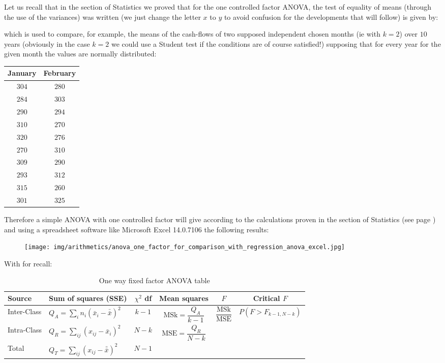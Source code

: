 	Let us recall that in the section of Statistics we proved that for the one controlled factor ANOVA, the test of equality of means (through the use of the variances) was written (we just change the letter $x$ to $y$ to avoid confusion for the developments that will follow) is given by:
	
	which is used to compare, for example, the means of the cash-flows of two supposed independent chosen months (ie with $k=2$) over $10$ years (obviously in the case $k=2$ we could use a Student test if the conditions are of course satisfied!) supposing that for every year for the given month the values are normally distributed:
	\begin{table}[H]
	\centering
			\begin{tabular}{|c|c|}
				\hline
				\cellcolor{black!30}\textbf{January} & \cellcolor{black!30}\textbf{February} \\ \hline
				$304$ & $280$ \\ \hline
				$284$ & $303$ \\ \hline
				$290$ & $294$ \\ \hline
				$310$ & $270$ \\ \hline
				$320$ & $276$ \\ \hline
				$270$ & $310$ \\ \hline
				$309$ & $290$ \\ \hline
				$293$ & $312$ \\ \hline
				$315$ & $260$ \\ \hline
				$301$ & $325$ \\ \hline
		\end{tabular}
	\end{table}
	Therefore a simple ANOVA with one controlled factor will give according to the calculations proven in the section of Statistics (see page \pageref{anova one way fixed factor}) and using a spreadsheet software like Microsoft Excel 14.0.7106 the following results:
	\begin{figure}[H]
		\centering
		\texttt{[image: img/arithmetics/anova\_one\_factor\_for\_comparison\_with\_regression\_anova\_excel.jpg]}
	\end{figure}
	With for recall:
	\begin{table}[H]\small
		\renewcommand{\arraystretch}{1.2}
		\centering
		\begin{tabular}{llcccc}\hline
		\textbf{Source} & \textbf{Sum of squares (SSE)} & $\chi^2$ \textbf{df} & \textbf{Mean squares} & $F$ & \textbf{Critical} $F$\\ \hline
		Inter-Class & $Q_A=\displaystyle\sum_{i}n_i\left(\bar{x}_{i}-\bar{\bar{x}}\right)^2$ & $k-1$ & $\text{MSk}=\displaystyle\dfrac{Q_A}{k-1}$ &
		$\displaystyle\dfrac{\text{MSk}}{\text{MSE}}$ & $P(F> F_{k-1,N-k})$ \\
		Intra-Class & $Q_R=\displaystyle\sum_{ij}\left(x_{ij}-\bar{x}_i\right)^2$ & $N-k$ & $ \text{MSE}=\displaystyle\dfrac{Q_R}{N-k}$  & & \\
		Total & $Q_T=\displaystyle\sum_{ij}\left(x_{ij}-\bar{\bar{x}}\right)^2$ & $N-1$ & & &\\ \hline
		\end{tabular}
		\caption[]{One way fixed factor ANOVA table}
	\end{table}
	

